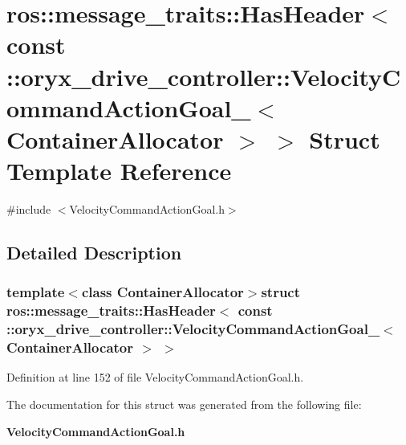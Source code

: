 \section{ros\-:\-:message\-\_\-traits\-:\-:\-Has\-Header$<$ const \-:\-:oryx\-\_\-drive\-\_\-controller\-:\-:\-Velocity\-Command\-Action\-Goal\-\_\-$<$ \-Container\-Allocator $>$ $>$ \-Struct \-Template \-Reference}
\label{structros_1_1message__traits_1_1HasHeader_3_01const_01_1_1oryx__drive__controller_1_1VelocityComb0dfd7dc0ef65f30e0af8ac706d84fbd}


{\ttfamily \#include $<$\-Velocity\-Command\-Action\-Goal.\-h$>$}



\subsection{\-Detailed \-Description}
\subsubsection*{template$<$class Container\-Allocator$>$struct ros\-::message\-\_\-traits\-::\-Has\-Header$<$ const \-::oryx\-\_\-drive\-\_\-controller\-::\-Velocity\-Command\-Action\-Goal\-\_\-$<$ Container\-Allocator $>$ $>$}



\-Definition at line 152 of file \-Velocity\-Command\-Action\-Goal.\-h.



\-The documentation for this struct was generated from the following file\-:\begin{DoxyCompactItemize}
\item 
{\bf \-Velocity\-Command\-Action\-Goal.\-h}\end{DoxyCompactItemize}
